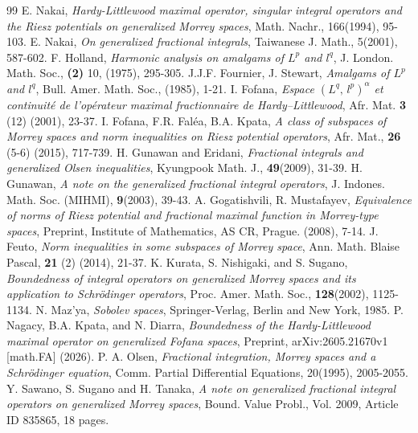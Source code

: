 \documentclass[10pt,a4paper]{amsart}
\numberwithin{equation}{section}
\numberwithin{equation}{section}
\begin{document}
\begin{thebibliography}{99}
 E. Nakai, \textit{Hardy-Littlewood maximal operator, singular integral operators and the Riesz potentials on generalized Morrey spaces}, Math. Nachr., 166(1994), 95-103.
 E. Nakai, \textit{On generalized fractional integrals}, Taiwanese J. Math., 5(2001), 587-602.
 F. Holland, \textit{Harmonic analysis on amalgams of $L^{p}$ and $l^{q}$}, J. London. Math. Soc., \textbf{(2)} 10, (1975), 295-305.
 J.J.F. Fournier, J. Stewart, \textit{Amalgams of $L^{p}$ and $l^{q}$}, Bull. Amer. Math. Soc.,  (1985), 1-21.
 I. Fofana, \textit{Espace $(L^{q},\, l^{ p})^{\alpha}$ et continuit\'e de l'opérateur maximal fractionnaire de Hardy–Littlewood}, Afr. Mat. \textbf{3} (12) (2001), 23-37.
 I. Fofana, F.R. Fal\'ea, B.A. Kpata, \textit{A class of subspaces of Morrey spaces and norm inequalities on Riesz potential operators}, Afr. Mat., \textbf{26} (5-6) (2015), 717-739.
 H. Gunawan and Eridani, \textit{Fractional integrals and generalized Olsen inequalities}, Kyungpook Math. J., \textbf{49}(2009), 31-39.
 H. Gunawan, \textit{A note on the generalized fractional integral operators}, J. Indones. Math. Soc. (MIHMI), \textbf{9}(2003), 39-43.
 A. Gogatishvili, R. Mustafayev, \textit{Equivalence of norms of Riesz potential and fractional maximal function in Morrey-type spaces}, Preprint, Institute of Mathematics, AS CR, Prague. (2008), 7-14.
 J. Feuto, \textit{Norm inequalities in some subspaces of Morrey space}, Ann. Math. Blaise Pascal, \textbf{21} (2) (2014), 21-37.
 K. Kurata, S. Nishigaki, and S. Sugano, \textit{Boundedness of integral operators on generalized Morrey spaces and its application to Schr\"odinger operators}, Proc. Amer. Math. Soc.,\textbf{ 128}(2002), 1125-1134.
 N. Maz'ya, \textit{Sobolev spaces}, Springer-Verlag, Berlin and New York, 1985.
 P. Nagacy, B.A. Kpata, and N. Diarra, \textit{Boundedness of the Hardy-Littlewood maximal operator on generalized Fofana spaces}, Preprint, arXiv:2605.21670v1 [math.FA] (2026).
 P. A. Olsen, \textit{Fractional integration, Morrey spaces and a Schr\"odinger equation}, Comm. Partial Differential Equations, 20(1995), 2005-2055.
 Y. Sawano, S. Sugano and H. Tanaka, \textit{A note on generalized fractional integral operators on generalized Morrey spaces}, Bound. Value Probl., Vol. 2009, Article ID 835865, 18 pages.

\end{thebibliography}
\end{document}
